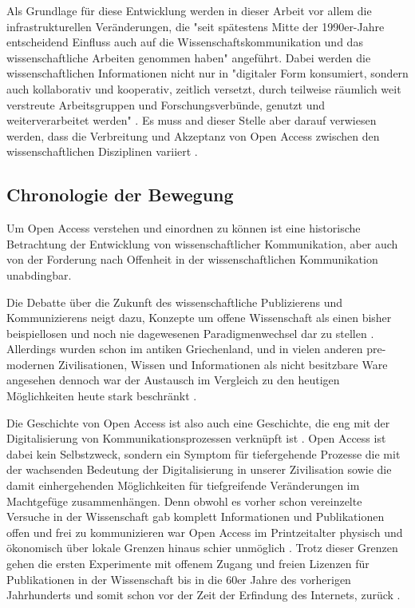 Als Grundlage für diese Entwicklung werden in dieser Arbeit vor allem die infrastrukturellen Veränderungen, die "seit spätestens Mitte der 1990er-Jahre entscheidend Einfluss auch auf die Wissenschaftskommunikation und das wissenschaftliche Arbeiten genommen haben" \cite{schulze_2013_open} angeführt. Dabei werden die wissenschaftlichen Informationen nicht nur in "digitaler Form konsumiert, sondern auch kollaborativ und kooperativ, zeitlich versetzt, durch teilweise räumlich weit verstreute Arbeitsgruppen und Forschungsverbünde, genutzt und weiterverarbeitet werden" \cite{schulze_2013_open}. Es muss and dieser Stelle aber darauf verwiesen werden, dass die Verbreitung und Akzeptanz von Open Access zwischen den wissenschaftlichen Disziplinen variiert \cite{cite:21a} .

\subsection{Chronologie der Bewegung}
Um Open Access verstehen und einordnen zu können ist eine historische Betrachtung der Entwicklung von wissenschaftlicher Kommunikation, aber auch von der Forderung nach Offenheit in der wissenschaftlichen Kommunikation unabdingbar. 

Die Debatte über die Zukunft des wissenschaftliche Publizierens und Kommunizierens neigt dazu, Konzepte um offene Wissenschaft als einen bisher beispiellosen und noch nie dagewesenen Paradigmenwechsel dar zu stellen \cite{cite:17a} \cite{cite:17b}. Allerdings wurden schon im antiken Griechenland, und in vielen anderen pre-modernen Zivilisationen, Wissen und Informationen als nicht besitzbare Ware angesehen\cite{cite:18} dennoch war der Austausch im Vergleich zu den heutigen Möglichkeiten heute stark beschränkt \cite{cite:17c}.

Die Geschichte von Open Access ist also auch eine Geschichte, die eng mit der Digitalisierung von Kommunikationsprozessen verknüpft ist \cite{albert_2006_open_implications}. Open Access ist dabei kein Selbstzweck\cite{cite:17d}, sondern ein Symptom für tiefergehende Prozesse die mit der wachsenden Bedeutung der Digitalisierung in unserer Zivilisation sowie die damit einhergehenden Möglichkeiten für tiefgreifende Veränderungen im Machtgefüge zusammenhängen\cite{cite:17e}. Denn obwohl es vorher schon vereinzelte Versuche in der Wissenschaft gab komplett Informationen und Publikationen offen und frei zu kommunizieren war Open Access im Printzeitalter physisch und ökonomisch über lokale Grenzen hinaus schier unmöglich \cite{cite:18a}. Trotz dieser Grenzen gehen die ersten Experimente mit offenem Zugang und freien Lizenzen für Publikationen in der Wissenschaft bis in die 60er Jahre des vorherigen Jahrhunderts und somit schon vor der Zeit der Erfindung des Internets, zurück \cite{cite:18b}. 

